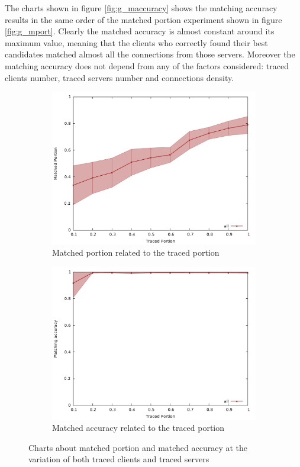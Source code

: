 The charts shown in figure \ref{fig:g_maccuracy} shows the matching
accuracy results in the same order of the matched portion experiment
shown in figure \ref{fig:g_mport}. Clearly the matched accuracy is
almost constant around its maximum value, meaning that the clients who
correctly found their best candidates matched almost all the connections
from those servers. Moreover the matching accuracy does not
depend from any of the factors considered: traced clients number, traced
servers number and connections density.

\begin{figure}
	\begin{subfigure}{.5\textwidth}
		\centering
		\includegraphics[width=1\linewidth]{graphs/cs_tport_mport.pdf}
		\caption{Matched portion related to the traced portion}
		\label{fig:g_tporta}
	\end{subfigure} 
	\begin{subfigure}{.5\textwidth}
		\centering
		\includegraphics[width=1\linewidth]{graphs/cs_tport_pmatch.pdf}
		\caption{Matched accuracy related to the traced portion}
		\label{fig:g_tportb}
	\end{subfigure} 
	\caption{Charts about matched portion and matched accuracy at the variation of both
traced clients and traced servers}
	\label{fig:g_tport}
\end{figure}

